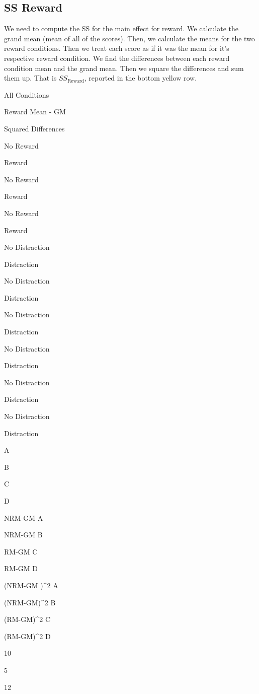\documentclass[]{book}
\begin{document}
\hypertarget{ss-reward}{%
\subsection{SS Reward}\label{ss-reward}}

We need to compute the SS for the main effect for reward. We calculate the grand mean (mean of all of the scores). Then, we calculate the means for the two reward conditions. Then we treat each score as if it was the mean for it's respective reward condition. We find the differences between each reward condition mean and the grand mean. Then we square the differences and sum them up. That is \(SS_\text{Reward}\), reported in the bottom yellow row.

All Conditions

Reward Mean - GM

Squared Differences

No Reward

Reward

No Reward

Reward

No Reward

Reward

No Distraction

Distraction

No Distraction

Distraction

No Distraction

Distraction

No Distraction

Distraction

No Distraction

Distraction

No Distraction

Distraction

A

B

C

D

NRM-GM A

NRM-GM B

RM-GM C

RM-GM D

(NRM-GM )\^{}2 A

(NRM-GM)\^{}2 B

(RM-GM)\^{}2 C

(RM-GM)\^{}2 D

10

5

12
\end{document}
